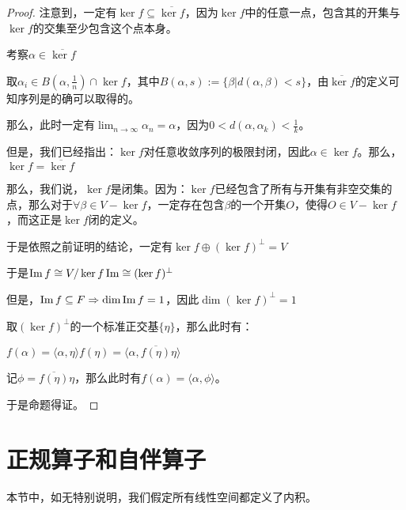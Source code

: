 \documentclass[12pt, a4paper, oneside, UTF8]{ctexbook}
\begin{document}
\begin{para}{0}
\begin{proof}
							注意到，一定有$\ker f \subseteq \overline{\ker f}$，因为$\ker f$中的任意一点，包含其的开集与$\ker f$的交集至少包含这个点本身。

							考察$\alpha \in \overline{\ker f}$

							取$\alpha_i \in B(\alpha ,\frac{1}{n}) \cap \ker f$，其中$B(\alpha ,s):=\{\beta |d(\alpha ,\beta )< s\}$，由$\overline{\ker f}$的定义可知序列是的确可以取得的。

							那么，此时一定有$\lim_{n \to \infty} \alpha_n = \alpha $，因为$0 < d(\alpha ,\alpha_k)<\frac{1}{k}$。

							但是，我们已经指出：$\ker f$对任意收敛序列的极限封闭，因此$\alpha \in \ker f$。那么，$\ker f = \overline{\ker f}$

							那么，我们说，$\ker f$是闭集。因为：$\ker f$已经包含了所有与开集有非空交集的点，那么对于$\forall \beta \in V-\ker f$，一定存在包含$\beta $的一个开集$O$，使得$O\in V-\ker f$，而这正是$\ker f$闭的定义。

							于是依照之前证明的结论，一定有$\ker f \oplus (\ker f)^{\perp} = V$

							于是$\operatorname{Im} f \cong V/\ker f \operatorname{Im} \cong (\ker f)^{\perp}$

							但是，$\operatorname{Im} f \subseteq F \Rightarrow \dim \operatorname{Im} f = 1$，因此$\dim (\ker f)^{\perp} = 1$

							取$(\ker f)^{\perp}$的一个标准正交基$\{\eta \}$，那么此时有：

							$f(\alpha )=\langle \alpha ,\eta \rangle f(\eta) =\langle \alpha ,\overline{f(\eta )}\eta \rangle$

							记$\phi = \overline{f(\eta )}\eta$，那么此时有$f(\alpha )=\langle \alpha ,\phi \rangle$。

							于是命题得证。
						\end{proof}
			\end{para}
	\section{正规算子和自伴算子}
		本节中，如无特别说明，我们假定所有线性空间都定义了内积。
\end{document}
